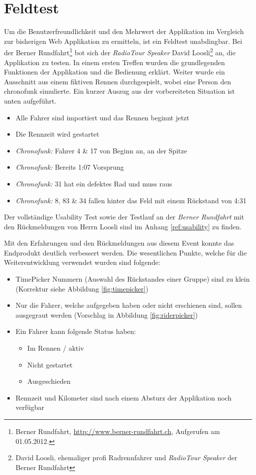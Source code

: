 \section{Feldtest}
Um die Benutzerfreundlichkeit und den Mehrwert der Applikation im Vergleich zur bisherigen Web Applikation zu ermitteln, ist ein Feldtest unabdingbar. Bei der Berner Rundfahrt\footnote{Berner Rundfahrt, \url{http://www.berner-rundfahrt.ch}, Aufgerufen am 01.05.2012.} bot sich der \textit{RadioTour Speaker} David Loosli\footnote{David Loosli, ehemaliger profi Radrennfahrer und \textit{RadioTour Speaker} der Berner Rundfahrt} an, die Applikation zu testen. In einem ersten Treffen wurden die grundlegenden Funktionen der Applikation und die Bedienung erklärt. Weiter wurde ein Ausschnitt aus einem fiktiven Rennen durchgespielt, wobei eine Person den \gls{chronofunk} simulierte. Ein kurzer Auszug aus der vorbereiteten Situation ist unten aufgeführt.

\begin{itemize}
\item Alle Fahrer sind importiert und das Rennen beginnt jetzt
\item Die Rennzeit wird gestartet
\item \textit{Chronofunk:} Fahrer 4 \& 17 von Beginn an, an der Spitze
\item \textit{Chronofunk:} Bereits 1:07 Vorsprung
\item \textit{Chronofunk:} 31 hat ein defektes Rad und muss raus
\item \textit{Chronofunk:} 8, 83 \& 34 fallen hinter das Feld mit einem Rückstand von 4:31
\end{itemize}

Der vollständige Usability Test sowie der Testlauf an der \textit{Berner Rundfahrt} mit den Rückmeldungen von Herrn Loosli sind im Anhang \ref{ref:usability} zu finden.

Mit den Erfahrungen und den Rückmeldungen aus diesem Event konnte das Endprodukt deutlich verbessert werden. Die wesentlichen Punkte, welche für die Weiterentwicklung verwendet wurden sind folgende:
\begin{itemize}
\item TimePicker Nummern (Auswahl des Rückstandes einer Gruppe) sind zu klein (Korrektur siehe Abbildung \ref{fig:timepicker})
\item Nur die Fahrer, welche aufgegeben haben oder nicht erschienen sind, sollen ausgegraut werden (Vorschlag in Abbildung \ref{fig:riderpicker})
\item Ein Fahrer kann folgende Status haben:
\begin{itemize}
\item Im Rennen / aktiv
\item Nicht gestartet
\item Ausgeschieden
\end{itemize}
\item Rennzeit und Kilometer sind nach einem Absturz der Applikation noch verfügbar
\end{itemize}


